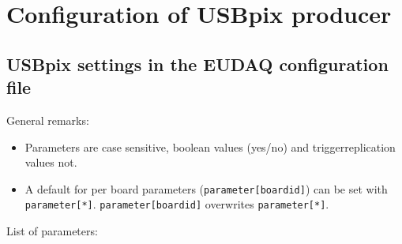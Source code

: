 \documentclass[a4paper,12pt]{article}
\begin{document}
\section{Configuration of USBpix producer}

\subsection{USBpix settings in the EUDAQ configuration file}

General remarks:
\begin{itemize}
\item Parameters are case sensitive, boolean values (yes/no) and 
trigger\textunderscore replication values not.
\item A default for per board parameters ({\tt parameter[boardid]}) can be set with {\tt parameter[*]}.
{\tt parameter[boardid]} overwrites {\tt parameter[*]}.
\end{itemize}
List of parameters:
\end{document}
